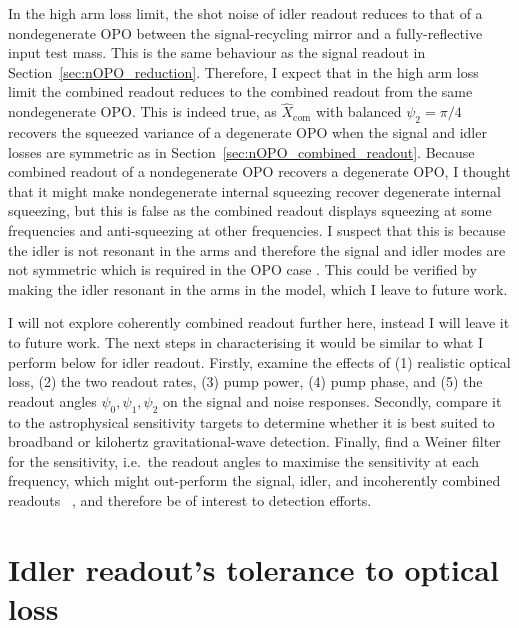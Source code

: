In the high arm loss limit, the shot noise of idler readout reduces to that of a nondegenerate OPO between the signal-recycling mirror and a fully-reflective input test mass. %
This is the same behaviour as the signal readout in Section~\ref{sec:nOPO_reduction}.
Therefore, I expect that in the high arm loss limit the combined readout reduces to the combined readout from the same nondegenerate OPO. This is indeed true, as $\hat X_\text{com}$ with balanced $\psi_2=\pi/4$  recovers the squeezed variance of a degenerate OPO when the signal and idler losses are symmetric  as in Section~\ref{sec:nOPO_combined_readout}.
Because combined readout of a nondegenerate OPO recovers a degenerate OPO, I thought that it might make nondegenerate internal squeezing recover degenerate internal squeezing, but this is false as the combined readout displays squeezing at some frequencies and anti-squeezing at other frequencies. I suspect that this is because the idler is not resonant in the arms and therefore the signal and idler modes are not symmetric which is required in the OPO case . This could be verified by making the idler resonant in the arms in the model, which I leave to future work.

I will not explore coherently combined readout further here, instead I will leave it to future work. The next steps in characterising it would be similar to what I perform below for idler readout. Firstly, examine the effects of (1) realistic optical loss, (2) the two readout rates, (3) pump power, (4) pump phase, and (5) the readout angles $\psi_0,\psi_1,\psi_2$ on the signal and noise responses. %
Secondly, compare it to the astrophysical sensitivity targets to determine whether it is best suited to broadband or kilohertz gravitational-wave detection. Finally, find a Weiner filter for the sensitivity, i.e.\ the readout angles to maximise the sensitivity at each frequency, which might out-perform the signal, idler, and incoherently combined readouts ~\cite{}, and therefore be of interest to detection efforts.


\section{Idler readout's tolerance to optical loss}

